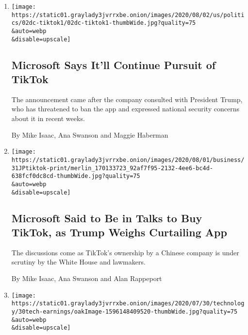 \begin{enumerate}
\def\labelenumi{\arabic{enumi}.}
\item
  \href{/2020/08/02/business/economy/trump-tiktok-china-national-security.html}{}

  \texttt{[image: https://static01.graylady3jvrrxbe.onion/images/2020/08/02/us/politics/02dc-tiktok1/02dc-tiktok1-thumbWide.jpg?quality=75\\\&auto=webp\\\&disable=upscale]}

  \hypertarget{microsoft-says-itll-continue-pursuit-of-tiktok}{%
  \subsection{Microsoft Says It'll Continue Pursuit of
  TikTok}\label{microsoft-says-itll-continue-pursuit-of-tiktok}}

  The announcement came after the company consulted with President
  Trump, who has threatened to ban the app and expressed national
  security concerns about it in recent weeks.

  By Mike Isaac, Ana Swanson and Maggie Haberman
\item
  \href{/2020/07/31/technology/tiktok-microsoft.html}{}

  \texttt{[image: https://static01.graylady3jvrrxbe.onion/images/2020/08/01/business/31JPtiktok-print/merlin\_170133723\_92af7f95-2132-4ee6-bc4d-638fcf0dc8cd-thumbWide.jpg?quality=75\\\&auto=webp\\\&disable=upscale]}

  \hypertarget{microsoft-said-to-be-in-talks-to-buy-tiktok-as-trump-weighs-curtailing-app}{%
  \subsection{Microsoft Said to Be in Talks to Buy TikTok, as Trump
  Weighs Curtailing
  App}\label{microsoft-said-to-be-in-talks-to-buy-tiktok-as-trump-weighs-curtailing-app}}

  The discussions come as TikTok's ownership by a Chinese company is
  under scrutiny by the White House and lawmakers.

  By Mike Isaac, Ana Swanson and Alan Rappeport
\item
  \href{/live/2020/07/31/business/stock-market-today-coronavirus/the-economy-is-in-record-decline-but-not-for-the-tech-giants}{}

  \texttt{[image: https://static01.graylady3jvrrxbe.onion/images/2020/07/30/technology/30tech-earnings/oakImage-1596148409520-thumbWide.jpg?quality=75\\\&auto=webp\\\&disable=upscale]}


\end{enumerate}
